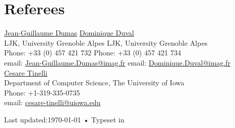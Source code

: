 \documentclass[12pt, a4paper]{article}
\begin{document}
\section*{Referees}
\href{http://ljk.imag.fr/membres/Jean-Guillaume.Dumas/}{Jean-Guillaume Dumas} \hfill \href{http://ljk.imag.fr/membres/Dominique.Duval/}{Dominique Duval}\\
LJK, University Grenoble Alpes \hfill LJK, University Grenoble Alpes\\
Phone: +33 (0) 457 421 732 \hfill Phone: +33 (0) 457 421 734 \\
email: \href{mailto:Jean-Guillaume.Dumas@imag.fr}{Jean-Guillaume.Dumas@imag.fr} \hfill email: \href{mailto:Dominique.Duval@imag.fr}{Dominique.Duval@imag.fr}\\

\href{http://homepage.cs.uiowa.edu/~tinelli/index.html}{Cesare Tinelli}\\
Department of Computer Science, The University of Iowa\\
Phone: +1-319-335-0735\\
email: \href{mailto:cesare-tinelli@uiowa.edu}{cesare-tinelli@uiowa.edu}\\


\begin{center}
{\scriptsize  Last updated:\today\- •\- 
Typeset in \href{http://en.wikipedia.org/wiki/XeTeX}{
\XeTeX}}
\end{center}
\end{document}
